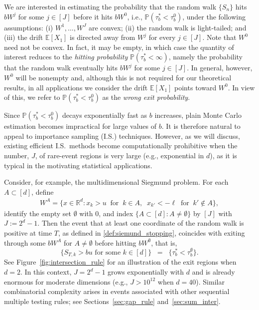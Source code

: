 \documentclass[aap,preprint]{imsart}
\newcommand{\Pro}{{\mathbb{P}}}
\newcommand{\Exp}{{\mathbb{E}}}
\theoremstyle{plain}
\theoremstyle{definition}
\begin{document}
We are interested in estimating the probability that the random walk $\{S_n\}$ hits $bW^j$ for some $j \in [J]$ before it hits $bW^0$, i.e., $\Pro\left(\tau_{b}^{*} < \tau_b^{0}\right)$, under the following assumptions: (i) $W^1,\ldots,W^J$ are convex; (ii) the random walk is light-tailed; and (iii) the drift $\Exp[X_1]$ is directed away from $W^j$ for every $j \in [J]$. Note that $W^0$ need not be convex. In fact, it may be empty, in which case the quantity of interest reduces to the \emph{hitting probability} $\Pro(\tau_b^{*} < \infty)$, namely the probability that the random walk eventually hits $bW^j$ for some $j \in [J]$. In general, however, $W^0$ will be nonempty and, although this is not required for our theoretical results, in all applications we consider the drift $\mathbb{E}[X_1]$ points toward $W^0$. In view of this, we refer to $\Pro\left(\tau_{b}^{*} < \tau_b^{0}\right)$ as the  \emph{wrong exit probability}.

Since  $\Pro\left(\tau_{b}^{*} < \tau_b^{0}\right)$ decays exponentially fast as $b$ increases,  plain Monte Carlo estimation becomes impractical for large values of $b$. It is therefore natural to appeal to importance sampling (I.S.) techniques. However, as we will discuss, existing efficient I.S.~methods become computationally prohibitive when the number, $J$, of rare-event regions is very large (e.g., exponential in $d$), as it is typical in the motivating statistical applications.



Consider, for example, the multidimensional Siegmund problem. For each $A \subset [d]$, define
\begin{align}
   \label{def:W_A} 
   W^{A} = \{x \in \mathbb{R}^d : x_{k} > u \;\; \text{for}\;\; k \in A, \;\; x_{k'} < -\ell \;\; \text{for}\;\; k' \notin A\},
\end{align}
identify the empty set $\emptyset$ with $0$, and index $\{A \subset [d] : A \neq \emptyset\}$ by $[J]$ with $J := 2^d - 1$. Then the event that at least one coordinate of the random walk is positive at time $T$, as defined in \eqref{def:siemund_stopping}, coincides with exiting through some $bW^{A}$ for $A \neq \emptyset$ before hitting $bW^{\emptyset}$, that is,
\[
\{S_{T,k} > bu \text{ for some } k \in [d]\} \;\;=\;\; \{\tau_{b}^{*} < \tau_b^{\emptyset}\}.
\]
See Figure~\ref{fig:intersection_rule} for an illustration of the exit regions when $d=2$. In this context, $J = 2^d - 1$ grows exponentially with $d$ and is already enormous for moderate dimensions (e.g., $J > 10^{12}$ when $d=40$). Similar combinatorial complexity arises in events associated with other sequential multiple testing rules; see Sections~\ref{sec:gap_rule} and~\ref{sec:sum_inter}.
\end{document}
